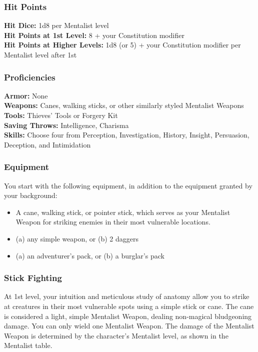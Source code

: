 \subsubsection{Hit Points}
\noindent\textbf{Hit Dice:} 1d8 per Mentalist level\\
\noindent\textbf{Hit Points at 1st Level:} 8 + your Constitution modifier\\
\noindent\textbf{Hit Points at Higher Levels:} 1d8 (or 5) + your Constitution modifier per Mentalist level after 1st

\subsubsection{Proficiencies}
\noindent\textbf{Armor:} None\\
\noindent\textbf{Weapons:} Canes, walking sticks, or other similarly styled Mentalist Weapons\\
\noindent\textbf{Tools:} Thieves' Tools or Forgery Kit\\
\noindent\textbf{Saving Throws:} Intelligence, Charisma\\
\noindent\textbf{Skills:} Choose four from Perception, Investigation, History, Insight, Persuasion, Deception, and Intimidation

\subsubsection{Equipment}
You start with the following equipment, in addition to the equipment granted by your background:
\begin{itemize}
  \item A cane, walking stick, or pointer stick, which serves as your Mentalist Weapon for striking enemies in their most vulnerable locations.
  \item (a) any simple weapon, or (b) 2 daggers
  \item (a) an adventurer's pack, or (b) a burglar’s pack
\end{itemize}


\subsubsection{Stick Fighting}
At 1st level, your intuition and meticulous study of anatomy allow you to strike at creatures in their most vulnerable spots using a simple stick or cane. The cane is considered a light, simple Mentalist Weapon, dealing non-magical bludgeoning damage. You can only wield one Mentalist Weapon. The damage of the Mentalist Weapon is determined by the character's Mentalist level, as shown in the Mentalist table.

